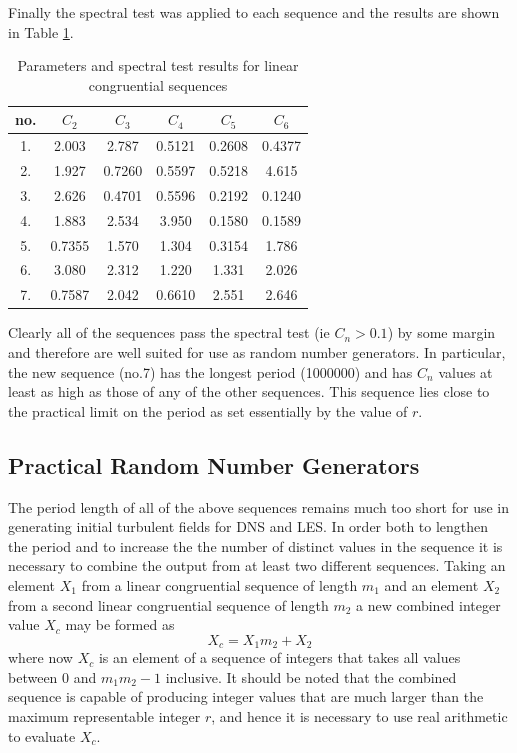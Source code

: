 \documentclass[dvips]{article}
\begin{document}
Finally the spectral test was applied to each sequence and the results are
shown in Table \ref{tabspec}.
\begin{table}[htbp]
\centering
\begin{tabular}{|c||c|c|c|c|c|} \hline
no. & $C_{2}$ & $C_{3}$ & $C_{4}$ & $C_{5}$ & $C_{6}$ 
\\ \hline
1. & 2.003 & 2.787 & 0.5121 & 0.2608 & 0.4377 \\ \hline
2. & 1.927 & 0.7260 & 0.5597 & 0.5218 & 4.615 \\ \hline
3. & 2.626 & 0.4701 & 0.5596 & 0.2192 & 0.1240 \\ \hline
4. & 1.883 & 2.534 & 3.950 & 0.1580 & 0.1589 \\ \hline
5. &  0.7355 & 1.570 & 1.304 & 0.3154 & 1.786 \\ \hline
6. & 3.080 & 2.312 & 1.220 & 1.331 & 2.026 \\ \hline
7. & 0.7587 & 2.042 & 0.6610 & 2.551 & 2.646 \\ \hline
\end{tabular}
\caption{Parameters and spectral test results for linear
congruential sequences}
\label{tabspec}
\end{table}
Clearly all of the sequences pass the spectral test (ie $C_{n} > 0.1$) by
some margin and therefore are well suited for use as random number
generators.  In particular, the new sequence (no.7) has the longest period
(1000000) and has $C_{n}$ values at least as high as those of any of the other
sequences.  This sequence lies close to the practical limit on the
period as set essentially by the value of $r$. 

\subsection*{Practical Random Number Generators}
The period length of all of the above sequences remains much too short for
use in generating initial turbulent fields for DNS and LES.
In order both to lengthen the period and to
increase the the number of distinct values in the sequence it is necessary
to combine the output from at least two different sequences.  Taking an
element $X_{1}$ from a
linear congruential sequence of length $m_{1}$ and an element $X_{2}$
from a second linear congruential sequence of
length $m_{2}$ a new combined integer value $X_{c}$ may be formed as 
\[
X_{c} = X_{1}m_{2} + X_{2}
\]
where now $X_{c}$ is an element of a sequence of integers that takes 
all values between $0$ and $m_{1}m_{2}-1$ inclusive.
It should be noted that the combined sequence is capable of producing
integer values that are much larger than the maximum representable integer
$r$, and hence it is necessary to use real arithmetic to evaluate
$X_{c}$.
\end{document}
